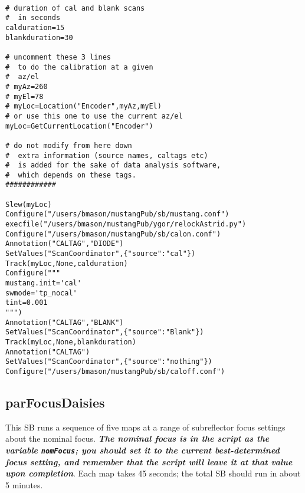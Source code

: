 \begin{lstlisting}

# duration of cal and blank scans
#  in seconds
calduration=15
blankduration=30

# uncomment these 3 lines
#  to do the calibration at a given
#  az/el
# myAz=260
# myEl=78
# myLoc=Location("Encoder",myAz,myEl)
# or use this one to use the current az/el
myLoc=GetCurrentLocation("Encoder")

# do not modify from here down
#  extra information (source names, caltags etc)
#  is added for the sake of data analysis software,
#  which depends on these tags.
############

Slew(myLoc)
Configure("/users/bmason/mustangPub/sb/mustang.conf")
execfile("/users/bmason/mustangPub/ygor/relockAstrid.py")
Configure("/users/bmason/mustangPub/sb/calon.conf")
Annotation("CALTAG","DIODE")
SetValues("ScanCoordinator",{"source":"cal"})
Track(myLoc,None,calduration)
Configure("""
mustang.init='cal'
swmode='tp_nocal'
tint=0.001
""")
Annotation("CALTAG","BLANK")
SetValues("ScanCoordinator",{"source":"Blank"})
Track(myLoc,None,blankduration)
Annotation("CALTAG")
SetValues("ScanCoordinator",{"source":"nothing"})
Configure("/users/bmason/mustangPub/sb/caloff.conf")
\end{lstlisting}

\subsection{parFocusDaisies}

This SB runs a sequence of five maps at a range of subreflector focus
settings about the nominal focus. {\bf \it The nominal focus is in the
script as the variable {\tt nomFocus}; you should set it to the current
best-determined focus setting, and remember that the script will leave
it at that value upon completion}. Each map takes 45 seconds; the total
SB should run in about 5 minutes.

